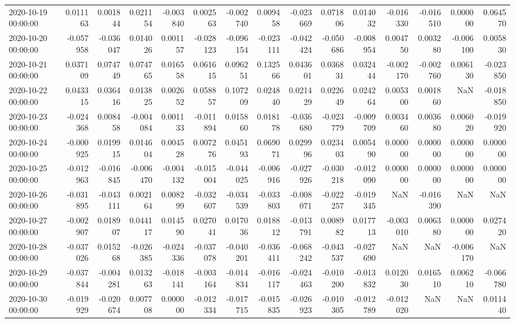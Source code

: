 \begin{tabular}{lrrrrrrrrrrrrrr}
2020-10-19 00:00:00 & 0.011163 & 0.001844 & 0.021154 & -0.003840 & 0.002563 & -0.002740 & 0.009458 & -0.023669 & 0.071806 & 0.014032 & -0.016330 & -0.016510 & 0.000000 & 0.064570 \\
2020-10-20 00:00:00 & -0.057958 & -0.036047 & 0.014026 & 0.001157 & -0.028123 & -0.096154 & -0.023111 & -0.042424 & -0.050686 & -0.008954 & 0.004750 & 0.003280 & -0.006100 & 0.005830 \\
2020-10-21 00:00:00 & 0.037109 & 0.074749 & 0.074765 & 0.016558 & 0.061615 & 0.096251 & 0.132566 & 0.043601 & 0.036831 & 0.032444 & -0.002170 & -0.002760 & 0.006130 & -0.023850 \\
2020-10-22 00:00:00 & 0.043315 & 0.036416 & 0.013825 & 0.002652 & 0.058857 & 0.107209 & 0.024840 & 0.021429 & 0.022649 & 0.024264 & 0.005300 & 0.001860 & NaN & -0.018850 \\
2020-10-23 00:00:00 & -0.024368 & 0.008458 & -0.004084 & 0.001133 & -0.011894 & 0.015860 & 0.018178 & -0.036680 & -0.023779 & -0.009709 & 0.003460 & 0.003680 & 0.006020 & -0.019920 \\
2020-10-24 00:00:00 & -0.000925 & 0.019915 & 0.014604 & 0.004528 & 0.007276 & 0.045193 & 0.069071 & 0.029996 & 0.023403 & 0.005490 & 0.000000 & 0.000000 & 0.000000 & 0.000000 \\
2020-10-25 00:00:00 & -0.012963 & -0.016845 & -0.006470 & -0.004132 & -0.015004 & -0.044025 & -0.006916 & -0.027926 & -0.030218 & -0.012090 & 0.000000 & 0.000000 & 0.000000 & 0.000000 \\
2020-10-26 00:00:00 & -0.031895 & -0.043111 & 0.002164 & 0.008299 & -0.032607 & -0.034539 & -0.033803 & -0.008071 & -0.022257 & -0.019345 & NaN & -0.016390 & NaN & NaN \\
2020-10-27 00:00:00 & -0.002907 & 0.018907 & 0.044117 & 0.014590 & 0.027041 & 0.017036 & 0.018812 & -0.013791 & 0.008982 & 0.017713 & -0.003010 & 0.006380 & 0.000000 & 0.027420 \\
2020-10-28 00:00:00 & -0.037026 & 0.015268 & -0.026385 & -0.024336 & -0.037078 & -0.040201 & -0.036411 & -0.068242 & -0.043537 & -0.027690 & NaN & NaN & -0.006170 & NaN \\
2020-10-29 00:00:00 & -0.037844 & -0.004281 & 0.013263 & -0.018141 & -0.003164 & -0.014834 & -0.016117 & -0.024463 & -0.010200 & -0.013832 & 0.012030 & 0.016510 & 0.006210 & -0.066780 \\
2020-10-30 00:00:00 & -0.019929 & -0.020674 & 0.007708 & 0.000000 & -0.012334 & -0.017715 & -0.015835 & -0.026923 & -0.010305 & -0.012789 & -0.012020 & NaN & NaN & 0.011440 \\

\end{tabular}
